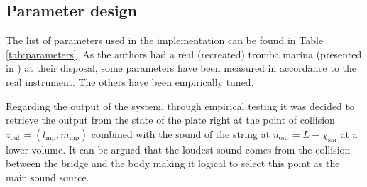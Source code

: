 \documentclass[dvipsnames, pdftex]{article}
\def\stringx{\chi}
\begin{document}
\subsection{Parameter design}
The list of parameters used in the implementation can be found in Table \ref{tab:parameters}. As the authors had a real (recreated) tromba marina (presented in \cite{Baldwin2016:SMC2020}) at their disposal, some parameters have been measured in accordance to the real instrument. The others have been empirically tuned.

Regarding the output of the system, through empirical testing it was decided to retrieve the output from the state of the plate right at the point of collision $z_\text{out} = (l_\text{mp},m_\text{mp})$ combined with the sound of the string at $u_\text{out} = L - \stringx_\text{sm}$ at a lower volume. It can be argued that the loudest sound comes from the collision between the bridge and the body making it logical to select this point as the main sound source. 
\end{document}
